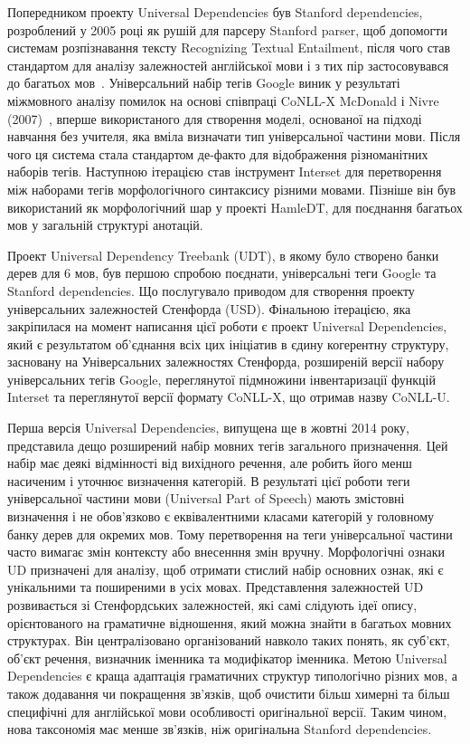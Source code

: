 Попередником проекту Universal Dependencies був Stanford dependencies, розроблений у 2005 році як рушій для парсеру Stanford parser, щоб допомогти системам розпізнавання тексту Recognizing Textual Entailment, після чого став стандартом для аналізу залежностей англійської мови і з тих пір застосовувався до багатьох мов~\cite{bib9}. Універсальний набір тегів Google виник у результаті міжмовного аналізу помилок на основі співпраці CoNLL-X McDonald і Nivre (2007)~\cite{bib10}, вперше використаного для створення моделі, основаної на підході навчання без учителя, яка вміла визначати тип універсальної частини мови. Після чого ця система стала стандартом де-факто для відображення різноманітних наборів тегів. Наступною ітерацією став інструмент Interset для перетворення між наборами тегів морфологічного синтаксису різними мовами. Пізніше він був використаний як морфологічний шар у проекті HamleDT, для поєднання багатьох мов у загальній структурі анотацій.

Проект Universal Dependency Treebank (UDT), в якому було створено банки дерев для 6 мов, був першою спробою поєднати, універсальні теги Google та Stanford dependencies. Що послугувало приводом для створення проекту універсальних залежностей Стенфорда (USD). Фінальною ітерацією, яка закріпилася на момент написання цієї роботи є проект Universal Dependencies, який є результатом об’єднання всіх цих ініціатив в єдину когерентну структуру, засновану на Універсальних залежностях Стенфорда, розширеній версії набору універсальних тегів Google, переглянутої підмножини інвентаризації функцій Interset та переглянутої версії формату CoNLL-X, що отримав назву CoNLL-U.

Перша версія Universal Dependencies, випущена ще в жовтні 2014 року, представила дещо розширений набір мовних тегів загального призначення. Цей набір має деякі відмінності від вихідного речення, але робить його менш насиченим і уточнює визначення категорій. В результаті цієї роботи теги універсальної частини мови (Universal Part of Speech) мають змістовні визначення і не обов'язково є еквівалентними класами категорій у головному банку дерев для окремих мов. Тому перетворення на теги універсальної частини часто вимагає змін контексту або внесенння змін вручну. Морфологічні ознаки UD призначені для аналізу, щоб отримати стислий набір основних ознак, які є унікальними та поширеними в усіх мовах. Представлення залежностей UD розвивається зі Стенфордських залежностей, які самі слідують ідеї опису, орієнтованого на граматичне відношення, який можна знайти в багатьох мовних структурах. Він централізовано організований навколо таких понять, як суб’єкт, об’єкт речення, визначник іменника та модифікатор іменника. Метою Universal Dependencies є краща адаптація граматичних структур типологічно різних мов, а також додавання чи покращення зв’язків, щоб очистити більш химерні та більш специфічні для англійської мови особливості оригінальної версії. Таким чином, нова таксономія має менше зв’язків, ніж оригінальна Stanford dependencies.


